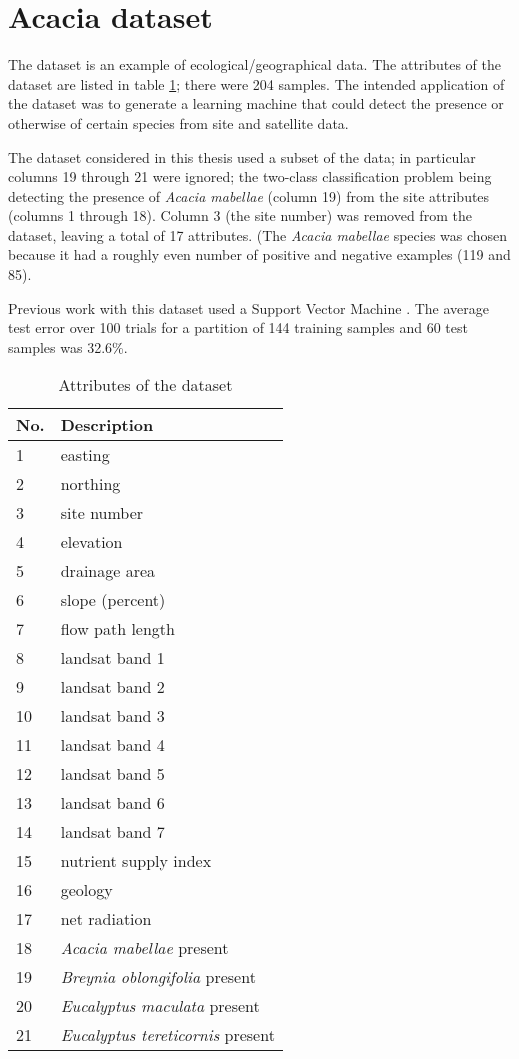 \section{Acacia dataset}

The  dataset is an example of ecological/geographical
data.  The attributes of the dataset are listed in table
\ref{tbl:acacia attributes}; there were 204 samples.  The intended
application of the dataset was to generate a learning machine that
could detect the presence or otherwise of certain species from site
and satellite data.

The  dataset considered in this thesis used a subset of the
data; in particular columns 19 through 21 were ignored; the two-class
classification problem being detecting the presence of {\it Acacia
mabellae} (column 19) from the site attributes (columns 1 through
18).  Column 3 (the site number) was removed from the dataset, leaving
a total of 17 attributes.  (The {\it Acacia mabellae} species was
chosen because it had a roughly even number of positive and negative
examples (119 and 85).

Previous work with this dataset \cite{Payne97, Williamson97a} used a
Support Vector Machine \cite{Vapnik98}.  The average test error over
100 trials for a partition of 144 training samples and 60 test samples
was 32.6\%.

\begin{table}
\begin{center}
\begin{tabular}{l l}
\hline
\bf{No.} & \bf{Description} \\
\hline\hline
1&	easting \\
2&	northing \\
3&	site number \\
4&	elevation  \\
5&	drainage area \\
6&	slope (percent)\\
7&	flow path length\\
8&	landsat band 1 \\
9&	landsat band 2\\
10&	landsat band 3\\
11&	landsat band 4 \\
12&	landsat band 5\\
13&	landsat band 6 \\
14&	landsat band 7 \\
15&	nutrient supply index\\
16&	geology\\
17&	net radiation\\
\hline
18&	{\it Acacia mabellae} present\\
19&	{\it Breynia oblongifolia} present\\
20&	{\it Eucalyptus maculata} present\\
21&	{\it Eucalyptus tereticornis} present\\
\hline
\end{tabular}
\end{center}
\caption{Attributes of the  dataset}
\label{tbl:acacia attributes}
\end{table}


